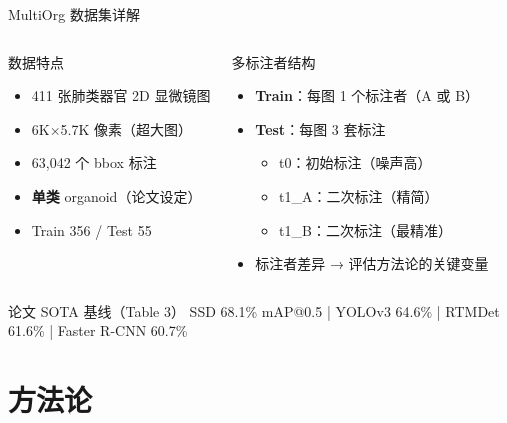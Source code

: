 \documentclass[aspectratio=169, 10pt]{beamer}
\begin{document}
\begin{frame}{MultiOrg 数据集详解}
  \begin{columns}[T]
    \begin{block}{数据特点}
      \begin{itemize}
        \item 411 张肺类器官 2D 显微镜图
        \item 6K$\times$5.7K 像素（超大图）
        \item 63,042 个 bbox 标注
        \item \textbf{单类} organoid（论文设定）
        \item Train 356 / Test 55
      \end{itemize}
    \end{block}
    \begin{block}{多标注者结构}
      \begin{itemize}
        \item \textbf{Train}：每图 1 个标注者（A 或 B）
        \item \textbf{Test}：每图 3 套标注
        \begin{itemize}
          \item t0：初始标注（噪声高）
          \item t1\_A：二次标注（精简）
          \item t1\_B：二次标注（最精准）
        \end{itemize}
        \item 标注者差异 → 评估方法论的关键变量
      \end{itemize}
    \end{block}
  \end{columns}
  \vspace{0em}
  \begin{alertblock}{论文 SOTA 基线（Table 3）}
    SSD 68.1\% mAP@0.5 \quad | \quad YOLOv3 64.6\% \quad | \quad RTMDet 61.6\% \quad | \quad Faster R-CNN 60.7\%
  \end{alertblock}
\end{frame}

\section{方法论}
\end{document}
